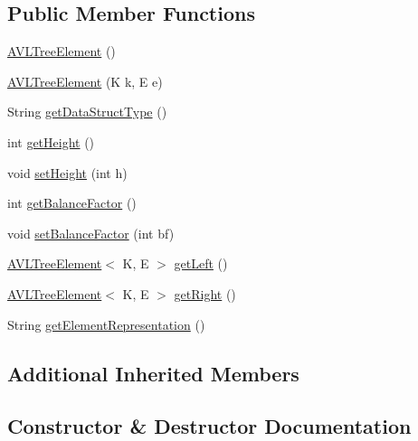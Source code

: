 \subsection*{Public Member Functions}
\begin{DoxyCompactItemize}
\item 
\hyperlink{classbridges_1_1base_1_1_a_v_l_tree_element_a8fe4490d3d5d16991736bd1a7243b904}{A\+V\+L\+Tree\+Element} ()
\item 
\hyperlink{classbridges_1_1base_1_1_a_v_l_tree_element_a060ec94b52675313ad15388e3f292df5}{A\+V\+L\+Tree\+Element} (K k, E e)
\item 
String \hyperlink{classbridges_1_1base_1_1_a_v_l_tree_element_abdd9e63de10732ef46bd5d531bd7f9d8}{get\+Data\+Struct\+Type} ()
\item 
int \hyperlink{classbridges_1_1base_1_1_a_v_l_tree_element_a52fe2886334c841547d238db69022697}{get\+Height} ()
\item 
void \hyperlink{classbridges_1_1base_1_1_a_v_l_tree_element_ac42b744989ed7e18dcbd52980e674b33}{set\+Height} (int h)
\item 
int \hyperlink{classbridges_1_1base_1_1_a_v_l_tree_element_a0478ca0351cd714e8f7b8e49703990c8}{get\+Balance\+Factor} ()
\item 
void \hyperlink{classbridges_1_1base_1_1_a_v_l_tree_element_a0dc3c83e750cc39535afb08ea92f6c98}{set\+Balance\+Factor} (int bf)
\item 
\hyperlink{classbridges_1_1base_1_1_a_v_l_tree_element}{A\+V\+L\+Tree\+Element}$<$ K, E $>$ \hyperlink{classbridges_1_1base_1_1_a_v_l_tree_element_a86f1329b19d2886ba7bf713e3844ecd6}{get\+Left} ()
\item 
\hyperlink{classbridges_1_1base_1_1_a_v_l_tree_element}{A\+V\+L\+Tree\+Element}$<$ K, E $>$ \hyperlink{classbridges_1_1base_1_1_a_v_l_tree_element_aab93418ac19605f2c7c57aa38d110921}{get\+Right} ()
\item 
String \hyperlink{classbridges_1_1base_1_1_a_v_l_tree_element_af7ab86f2421864daa4fdc2e84939f4ce}{get\+Element\+Representation} ()
\end{DoxyCompactItemize}
\subsection*{Additional Inherited Members}


\subsection{Constructor \& Destructor Documentation}
\mbox{\label{classbridges_1_1base_1_1_a_v_l_tree_element_a8fe4490d3d5d16991736bd1a7243b904}} 
